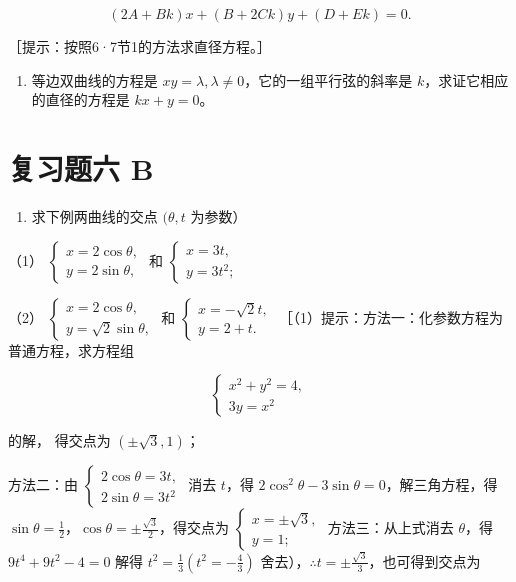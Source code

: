 \[
(2 A + B k) x + (B + 2 C k) y + (D + E k) = 0.
\]

［提示：按照6·7节1的方法求直径方程。］

\begin{enumerate}
\def\labelenumi{\arabic{enumi}.}
\setcounter{enumi}{11}
\tightlist
\item
  等边双曲线的方程是
  \(xy = \lambda, \lambda \neq 0\)，它的一组平行弦的斜率是
  \(k\)，求证它相应的直径的方程是 \(kx + y = 0\)。
\end{enumerate}

\section{复习题六 B}\label{ux590dux4e60ux9898ux516d-b}

\begin{enumerate}
\def\labelenumi{\arabic{enumi}.}
\tightlist
\item
  求下例两曲线的交点 \((\theta, t\) 为参数）
\end{enumerate}

（1）
\(\left\{ \begin{array}{l} x = 2\cos \theta, \\ y = 2\sin \theta, \end{array} \right.\)
和 \(\left\{ \begin{array}{l} x = 3t, \\ y = 3t^2; \end{array} \right.\)

（2）
\(\left\{ \begin{array}{l} x = 2\cos \theta, \\ y = \sqrt{2}\sin \theta, \end{array} \right.\)
和
\(\left\{ \begin{array}{l} x = -\sqrt{2} t, \\ y = 2 + t. \end{array} \right.\)
［（1）提示：方法一：化参数方程为普通方程，求方程组

\[
\left\{ \begin{array}{l} x^{2} + y^{2} = 4, \\ 3 y = x^{2} \end{array} \right.
\]

的解， 得交点为 \((\pm \sqrt{3}, 1)\)；

方法二：由
\(\left\{ \begin{array}{l} 2\cos \theta = 3t, \\ 2\sin \theta = 3t^2 \end{array} \right.\)
消去 \(t\)，得 \(2\cos^2\theta - 3\sin \theta = 0\)，解三角方程，得
\(\sin \theta = \frac{1}{2}\)，\(\cos \theta = \pm \frac{\sqrt{3}}{2}\)，得交点为
\(\left\{ \begin{array}{l} x = \pm \sqrt{3}, \\ y = 1; \end{array} \right.\)
方法三：从上式消去 \(\theta\)，得 \(9t^4 + 9t^2 - 4 = 0\) 解得
\(t^2 = \frac{1}{3}\left(t^2 = -\frac{4}{3}\right)\)
舍去），\(\therefore t = \pm \frac{\sqrt{3}}{3}\)，也可得到交点为

